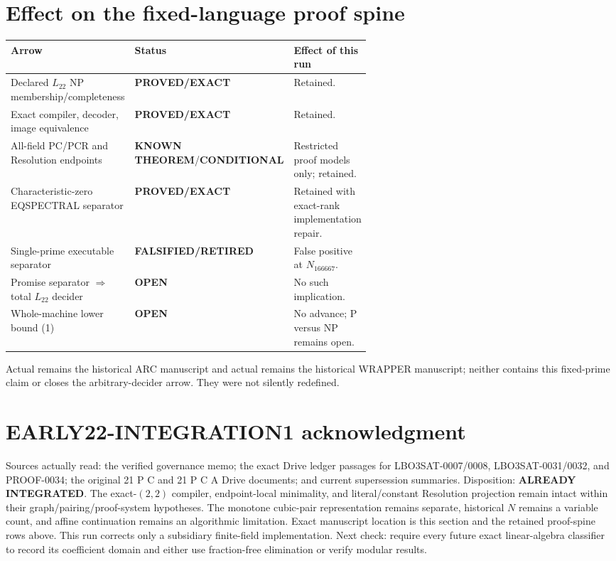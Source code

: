 \documentclass[11pt]{article}
\newcommand{\EXACT}{\textbf{PROVED/EXACT}}
\newcommand{\KNOWN}{\textbf{KNOWN THEOREM}}
\newcommand{\COND}{\textbf{CONDITIONAL}}
\newcommand{\OPEN}{\textbf{OPEN}}
\newcommand{\RET}{\textbf{FALSIFIED/RETIRED}}
\newcommand{\Ltwo}{L_{22}}
\begin{document}
\section{Effect on the fixed-language proof spine}
\begin{center}
\begin{tabularx}{0.98\linewidth}{@{}p{0.41\linewidth}p{0.18\linewidth}X@{}}
\toprule
Arrow & Status & Effect of this run\\
\midrule
Declared $\Ltwo$ NP membership/completeness & \EXACT & Retained.\\
Exact compiler, decoder, image equivalence & \EXACT & Retained.\\
All-field PC/PCR and Resolution endpoints & \KNOWN/\COND & Restricted proof models only; retained.\\
Characteristic-zero EQSPECTRAL separator & \EXACT & Retained with exact-rank implementation repair.\\
Single-prime executable separator & \RET & False positive at $N_{166667}$.\\
Promise separator $\Rightarrow$ total $\Ltwo$ decider & \OPEN & No such implication.\\
Whole-machine lower bound (1) & \OPEN & No advance; P versus NP remains open.\\
\bottomrule
\end{tabularx}
\end{center}

Actual  remains the historical ARC manuscript and actual
 remains the historical WRAPPER manuscript; neither contains
this fixed-prime claim or closes the arbitrary-decider arrow.  They were not
silently redefined.

\section{EARLY22-INTEGRATION1 acknowledgment}
Sources actually read: the verified governance memo; the exact Drive ledger
passages for LBO3SAT-0007/0008, LBO3SAT-0031/0032, and PROOF-0034; the original
21 P C and 21 P C A Drive documents; and current supersession summaries.
Disposition: \textbf{ALREADY INTEGRATED}.  The exact-$(2,2)$ compiler,
endpoint-local minimality, and literal/constant Resolution projection remain
intact within their graph/pairing/proof-system hypotheses.  The monotone
cubic-pair representation remains separate, historical $N$ remains a variable
count, and affine continuation remains an algorithmic limitation.  Exact
manuscript location is this section and the retained proof-spine rows above.
This run corrects only a subsidiary finite-field implementation.  Next check:
require every future exact linear-algebra classifier to record its coefficient
domain and either use fraction-free elimination or verify modular results.
\end{document}
